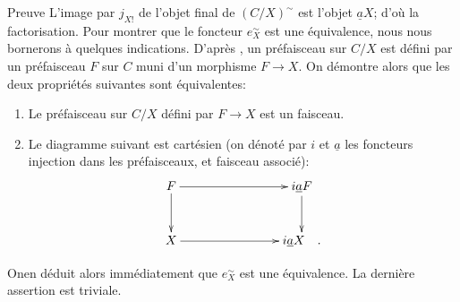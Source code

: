 \documentclass[10pt]{../fichiers-configuration-latex/smfart}
\begin{document}
\begin{enonce*}[remark]{Preuve}
L'image par $j_{X!}$ de l'objet final de $(C/X)^{\sim}$ est l'objet
$\underline{a}X$; d'où la factorisation. Pour montrer que le foncteur
$e^{\sim}_X$ est une équivalence, nous nous bornerons à quelques
indications. D'après , un préfaisceau sur $C/X$ est
défini par un préfaisceau $F$ sur $C$ muni d'un morphisme
$F\rightarrow X$. On démontre alors que les deux propriétés
suivantes sont équivalentes:
\begin{enumerate}
\renewcommand{\theenumi}{\roman{enumi}}
\renewcommand{\labelenumi}{\theenumi)}
\item Le préfaisceau sur $C/X$ défini par $F\rightarrow X$ est un
faisceau.

\item Le diagramme suivant est cartésien (on dénoté par $i$ et
$\underline{a}$ les foncteurs injection dans les préfaisceaux, et
faisceau associé):
\[
\xymatrix@C=2.75cm@R=1cm{
F \ar[r]\ar[d]& i\mathsf{\underline{a}}F \ar[d]\\
X \ar[r]& i\mathsf{\underline{a}}X\quad . }
\]
\end{enumerate}

On\pageoriginale en déduit alors immédiatement que
$e^{\sim}_X$ est une équivalence. La dernière assertion est
triviale.
\end{enonce*}
\end{document}
